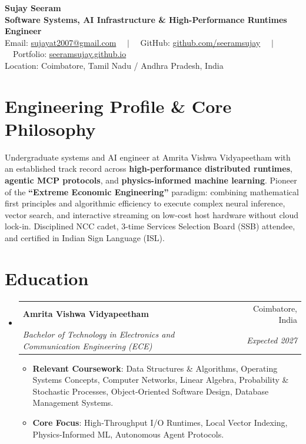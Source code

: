 \documentclass[letterpaper,10pt]{article}
\makeatletter
\newcommand{\resumeSubheading}[4]{
  \vspace{-2pt}\item
    \begin{tabular*}{\linewidth}[t]{l@{\extracolsep{\fill}}r}
      \textbf{#1} & #2 \\
      \textit{\small#3} & \textit{\small #4} \\
    \end{tabular*}\vspace{-3pt}
}
\newcommand{\resumeSubHeadingListStart}{\begin{itemize}[leftmargin=*]}
\newcommand{\resumeSubHeadingListEnd}{\end{itemize}}
\newcommand{\resumeItemListStart}{\begin{itemize}[leftmargin=14pt, labelsep=4pt, itemsep=0.5pt, parsep=0pt]}
\newcommand{\resumeItemListEnd}{\end{itemize}\vspace{-3pt}}
\makeatother
\begin{document}
\begin{center}
  {\Huge \textbf{Sujay Seeram}} \\ \vspace{3pt}
  \textbf{Software Systems, AI Infrastructure \& High-Performance Runtimes Engineer} \\ \vspace{3pt}
  \small Email: \href{mailto:sujayat2007@gmail.com}{sujayat2007@gmail.com} \ \ $|$ \ \ 
  GitHub: \href{https://github.com/seeramsujay}{github.com/seeramsujay} \ \ $|$ \ \ 
  Portfolio: \href{https://seeramsujay.github.io}{seeramsujay.github.io} \\ \vspace{1pt}
  \footnotesize Location: Coimbatore, Tamil Nadu / Andhra Pradesh, India
\end{center}

\vspace{-4pt}
\section{Engineering Profile \& Core Philosophy}
\vspace{1pt}
\small{
Undergraduate systems and AI engineer at Amrita Vishwa Vidyapeetham with an established track record across \textbf{high-performance distributed runtimes}, \textbf{agentic MCP protocols}, and \textbf{physics-informed machine learning}. Pioneer of the \textbf{``Extreme Economic Engineering''} paradigm: combining mathematical first principles and algorithmic efficiency to execute complex neural inference, vector search, and interactive streaming on low-cost host hardware without cloud lock-in. Disciplined NCC cadet, 3-time Services Selection Board (SSB) attendee, and certified in Indian Sign Language (ISL).
}

\section{Education}
  \resumeSubHeadingListStart
    \resumeSubheading
      {Amrita Vishwa Vidyapeetham}{Coimbatore, India}
      {Bachelor of Technology in Electronics and Communication Engineering (ECE)}{Expected 2027}
      \resumeItemListStart
        \item{\textbf{Relevant Coursework}: Data Structures \& Algorithms, Operating Systems Concepts, Computer Networks, Linear Algebra, Probability \& Stochastic Processes, Object-Oriented Software Design, Database Management Systems.}
        \item{\textbf{Core Focus}: High-Throughput I/O Runtimes, Local Vector Indexing, Physics-Informed ML, Autonomous Agent Protocols.}
      \resumeItemListEnd
  \resumeSubHeadingListEnd
\end{document}
